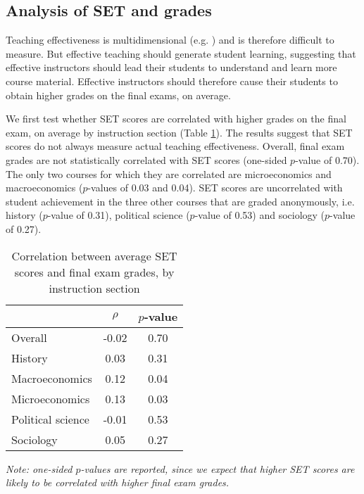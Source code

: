 \documentclass[12pt]{article}
\begin{document}
\subsection{Analysis of SET and grades}

Teaching effectiveness is multidimensional (e.g. \citet{Marsh1997}) and is therefore difficult to measure. But effective teaching should generate student learning, suggesting that effective instructors should lead their students to understand and learn more course material. Effective instructors should therefore cause their students to obtain higher grades on the final exams, on average. 

We first test whether SET scores are correlated with higher grades on the final exam, on average by instruction section (Table \ref{tab:finalexam}). The results suggest that SET scores do not always measure actual teaching effectiveness. Overall, final exam grades are not statistically correlated with SET scores (one-sided $p$-value of 0.70). The only two courses for which they are correlated are microeconomics and macroeconomics ($p$-values of 0.03 and 0.04). SET scores are uncorrelated with student achievement in the three other courses that are graded anonymously, i.e. history ($p$-value of 0.31), political science ($p$-value of 0.53) and sociology ($p$-value of 0.27). 

\begin{table}[htbp]
  \centering
  \footnotesize 
  \caption{Correlation between average SET scores and final exam grades, by instruction section}
    \begin{tabular}{lcc}
    \toprule 
                        & $\rho$  & $p$-value  \\
   \midrule
    Overall &            -0.02 &       0.70  \\
    History &             0.03 &       0.31  \\
    Macroeconomics &      0.12 &       0.04  \\
    Microeconomics &      0.13 &       0.03  \\
    Political science &  -0.01 &       0.53  \\
    Sociology &           0.05 &       0.27  \\
    \bottomrule
    \end{tabular}%
 \label{tab:finalexam}%
 
  \textit{Note: one-sided $p$-values are reported, since we expect that higher SET scores are likely to be correlated with higher final exam grades.}
\end{table}%
\normalsize
\end{document}
